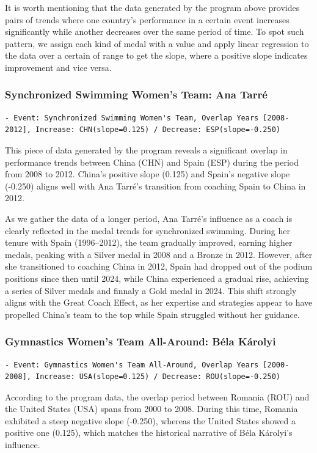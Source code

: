 \documentclass{mcmthesis}
\begin{document}
It is worth mentioning that the data generated by the program above provides pairs of trends where one country's performance in a certain event increases significantly while another decreases over the same period of time. To spot such pattern, we assign each kind of medal with a value and apply linear regression to the data over a certain of range to get the slope, where a positive slope indicates improvement and vice versa.

\subsubsection{Synchronized Swimming Women's Team: Ana Tarré}
\begin{lstlisting}
- Event: Synchronized Swimming Women's Team, Overlap Years [2008-2012], Increase: CHN(slope=0.125) / Decrease: ESP(slope=-0.250)
\end{lstlisting}

This piece of data generated by the program reveals a significant overlap in performance trends between China (CHN) and Spain (ESP) during the period from 2008 to 2012. China's positive slope (0.125) and Spain's negative slope (-0.250) aligns well with Ana Tarré's transition from coaching Spain to China in 2012.

As we gather the data of a longer period, Ana Tarré's influence as a coach is clearly reflected in the medal trends for synchronized swimming. During her tenure with Spain (1996–2012), the team gradually improved, earning higher medals, peaking with a Silver medal in 2008 and a Bronze in 2012. However, after she transitioned to coaching China in 2012, Spain had dropped out of the podium positions since then until 2024, while China experienced a gradual rise, achieving a series of Silver medals and finnaly a Gold medal in 2024. This shift strongly aligns with the Great Coach Effect, as her expertise and strategies appear to have propelled China's team to the top while Spain struggled without her guidance.

\subsubsection{Gymnastics Women's Team All-Around: Béla Károlyi}
\begin{lstlisting}
- Event: Gymnastics Women's Team All-Around, Overlap Years [2000-2008], Increase: USA(slope=0.125) / Decrease: ROU(slope=-0.250)
\end{lstlisting}

According to the program data, the overlap period between Romania (ROU) and the United States (USA) spans from 2000 to 2008. During this time, Romania exhibited a steep negative slope (-0.250), whereas the United States showed a positive one (0.125), which matches the historical narrative of Béla Károlyi's influence.
\end{document}
